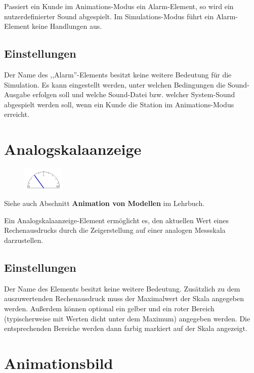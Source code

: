 Passiert ein Kunde im Animations-Modus ein Alarm-Element, so wird ein nutzerdefinierter Sound abgespielt.
Im Simulations-Modus führt ein Alarm-Element keine Handlungen aus.

\subsection*{Einstellungen}

Der Name des ,,Alarm''-Elements besitzt keine weitere Bedeutung für die Simulation.
Es kann eingestellt werden, unter welchen Bedingungen die Sound-Ausgabe erfolgen soll
und welche Sound-Datei bzw. welcher System-Sound abgespielt werden soll,
wenn ein Kunde die Station im Animations-Modus erreicht.


\section{Analogskalaanzeige}
\label{ref:ModelElementAnimationPointerMeasuring}

\begin{figure}
\vspace{-22pt}
\includegraphics[width=2cm]{imageModelElementAnimationPointerMeasuring.png}
\vspace{-22pt}
\end{figure}

Siehe auch Abschnitt \textbf{Animation von Modellen} im Lehrbuch.

Ein Analogskalaanzeige-Element ermöglicht es, den aktuellen Wert eines Rechenausdrucks
durch die Zeigerstellung auf einer analogen Messskala darzustellen.

\subsection*{Einstellungen}

Der Name des Elements besitzt keine weitere Bedeutung.
Zusätzlich zu dem auszuwertenden Rechenausdruck muss
der Maximalwert der Skala angegeben werden. Außerdem können
optional ein gelber und ein roter Bereich (typischerweise
mit Werten dicht unter dem Maximum) angegeben werden. Die
entsprechenden Bereiche werden dann farbig markiert auf
der Skala angezeigt.


\section{Animationsbild}
\label{ref:ModelElementAnimationImage}

